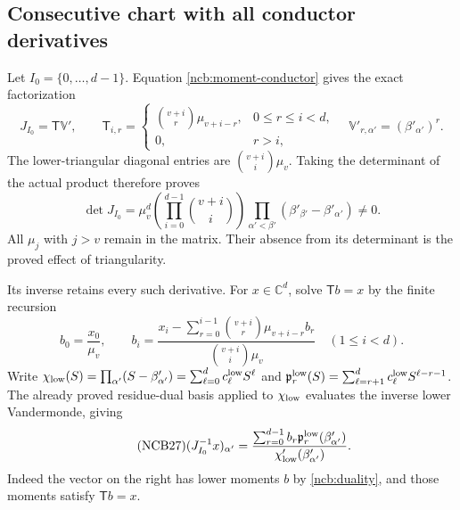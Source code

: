 \documentclass[11pt,a4paper]{article}
\begin{document}
\subsection{Consecutive chart with all conductor derivatives}
Let $I_0=\{0,\ldots,d-1\}$. Equation \eqref{ncb:moment-conductor}
gives the exact factorization
\begin{equation}\tag{NCB24}\label{ncb:triangular}
J_{I_0}=\mathsf T\mathbb V',\qquad
\mathsf T_{i,r}=
\begin{cases}\binom{v+i}{r}\mu_{v+i-r},&0\leq r\leq i<d,\\
0,&r>i,\end{cases}
\quad \mathbb V'_{r,\alpha'}=(\beta'_{\alpha'})^r .
\end{equation}
The lower-triangular diagonal entries are
$\binom{v+i}{i}\mu_v$. Taking the determinant of the actual product
therefore proves
\begin{equation}\tag{NCB25}\label{ncb:consecutive-det}
\det J_{I_0}
=\mu_v^d\left(\prod_{i=0}^{d-1}\binom{v+i}{i}\right)
 \prod_{\alpha'<\beta'}(\beta'_{\beta'}-\beta'_{\alpha'})\ne0 .
\end{equation}
All $\mu_j$ with $j>v$ remain in the matrix. Their absence from its
determinant is the proved effect of triangularity.

Its inverse retains every such derivative. For $x\in\mathbb C^d$,
solve $\mathsf T b=x$ by the finite recursion
\begin{equation}\tag{NCB26}\label{ncb:triangular-inverse}
b_0=\frac{x_0}{\mu_v},\qquad
b_i=\frac{x_i-\sum_{r=0}^{i-1}
          \binom{v+i}{r}\mu_{v+i-r}b_r}
          {\binom{v+i}{i}\mu_v}\quad(1\leq i<d).
\end{equation}
Write
$\chi_{\rm low}(S)=\prod_{\alpha'}(S-\beta'_{\alpha'})
=\sum_{\ell=0}^{d}c_\ell^{\rm low}S^\ell$
and
$\mathfrak p_r^{\rm low}(S)
=\sum_{\ell=r+1}^{d}c_\ell^{\rm low}S^{\ell-r-1}$.
The already proved residue-dual basis applied to $\chi_{\rm low}$
evaluates the inverse lower Vandermonde, giving
\begin{equation}\tag{NCB27}\label{ncb:full-inverse}
(J_{I_0}^{-1}x)_{\alpha'}
=\frac{\sum_{r=0}^{d-1}b_r\mathfrak p_r^{\rm low}(\beta'_{\alpha'})}
          {\chi_{\rm low}'(\beta'_{\alpha'})}.
\end{equation}
Indeed the vector on the right has lower moments $b$ by
\eqref{ncb:duality}, and those moments satisfy $\mathsf T b=x$.
\end{document}
